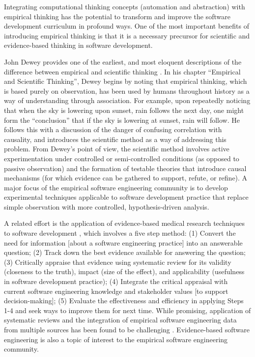 Integrating computational thinking concepts (automation and abstraction)
with empirical thinking has the potential to transform and improve the
software development curriculum in profound ways. One of the most important
benefits of introducing empirical thinking is that it is a necessary
precursor for scientific and evidence-based thinking in software
development.

John Dewey provides one of the earliest, and most eloquent descriptions of
the difference between empirical and scientific thinking \citep{Dewey10}.
In his chapter ``Empirical and Scientific Thinking'', Dewey begins by
noting that empirical thinking, which is based purely on observation, has
been used by humans throughout history as a way of understanding through
association.  For example, upon repeatedly noticing that when the sky is
lowering upon sunset, rain follows the next day, one might form the
``conclusion'' that if the sky is lowering at sunset, rain will follow.  He
follows this with a discussion of the danger of confusing correlation with
causality, and introduces the scientific method as a way of addressing this
problem.  From Dewey's point of view, the scientific method involves active
experimentation under controlled or semi-controlled conditions (as opposed
to passive observation) and the formation of testable theories that
introduce causal mechanisms (for which evidence can be gathered to support,
refute, or refine).  A major focus of the empirical software engineering
community is to develop experimental techniques applicable to software
development practice that replace simple observation with more controlled,
hypothesis-driven analysis.

A related effort is the application of evidence-based medical research
techniques to software development \citep{Kitchenham04,Kitchenham04a},
which involves a five step method: (1) Convert the need for information
[about a software engineering practice] into an answerable question; (2)
Track down the best evidence available for answering the question; (3)
Critically appraise that evidence using systematic review for its validity
(closeness to the truth), impact (size of the effect), and applicability
(usefulness in software development practice); (4) Integrate the critical
appraisal with current software engineering knowledge and stakeholder
values [to support decision-making]; (5) Evaluate the effectiveness and
efficiency in applying Steps 1-4 and seek ways to improve them for next
time.  While promising, application of systematic reviews and the
integration of empirical software engineering data from multiple sources
has been found to be challenging \citep{Jedlitschka04}.  Evidence-based
software engineering is also a topic of interest to the empirical software
engineering community.

